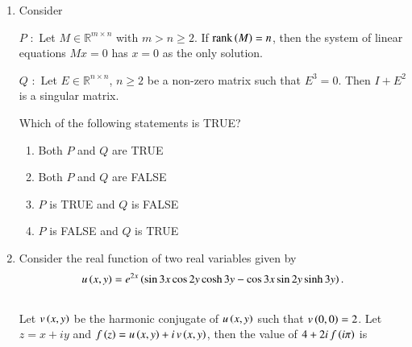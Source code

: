 \documentclass[journal,12pt,onecolumn]{IEEEtran}
\theoremstyle{remark}
\begin{document}
\begin{enumerate}
\hfill{}


\begin{enumerate}
\end{enumerate}
\newpage
\item Consider

$P$ $\colon$ Let $M \in \mathbb{R}^{m\times n}$ with $m>n\ge 2$. If $\operatorname{rank}\left(M\right)=n$, then the system of linear equations $Mx=0$ has $x=0$ as the only solution.

$Q$ $\colon$ Let $E \in \mathbb{R}^{n\times n}$, $n\ge 2$ be a non-zero matrix such that $E^{3}=0$. Then $I+E^{2}$ is a singular matrix.

Which of the following statements is TRUE?

\hfill{}

\begin{enumerate}
\item Both $P$ and $Q$ are TRUE
\item Both $P$ and $Q$ are FALSE
\item $P$ is TRUE and $Q$ is FALSE
\item $P$ is FALSE and $Q$ is TRUE
\end{enumerate}

\item Consider the real function of two real variables given by
$$u\left(x,y\right) = e^{2x}\left(\sin 3x \cos 2y \cosh 3y - \cos 3x \sin 2y \sinh 3y\right).$$\\
Let $v\left(x,y\right)$ be the harmonic conjugate of $u\left(x,y\right)$ such that $v\left(0,0\right)=2$. Let $z=x+iy$ and $f\left(z\right)=u\left(x,y\right)+i\,v\left(x,y\right)$, then the value of $4+2i\,f\left(i\pi\right)$ is

\hfill{}

\begin{enumerate}
\end{enumerate}


\end{enumerate}
\end{document}
